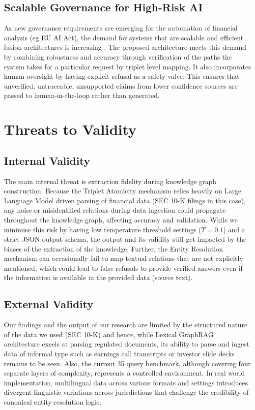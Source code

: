 \documentclass[conference]{IEEEtran}
\begin{document}
\subsection{Scalable Governance for High-Risk AI}
As new governance requirements are emerging for the automation of financial analysis (eg EU AI Act), the demand for systems that are scalable and efficient fusion architectures is increasing \cite{euaiact2024,occaiprinciples,fcaai2024}. The proposed architecture meets this demand by combining robustness and accuracy through verification of the paths the system takes for a particular request by triplet level mapping. It also incorporates human oversight by having explicit refusal as a safety valve. This ensures that unverified, untraceable, unsupported claims from lower confidence sources are passed to human-in-the-loop rather than generated.

\section{Threats to Validity}
\subsection{Internal Validity}
The main internal threat is extraction fidelity during knowledge graph construction. Because the Triplet Atomicity mechanism relies heavily on Large Language Model driven parsing of financial data (SEC 10-K filings in this case), any noise or misidentified relations during data ingestion could propagate throughout the knowledge graph, affecting accuracy and validation. While we minimise this risk by having low temperature threshold settings ($T=0.1$) and a strict JSON output schema, the output and its validity still get impacted by the biases of the extraction of the knowledge. Further, the Entity Resolution mechanism can occasionally fail to map textual relations that are not explicitly mentioned, which could lead to false refusals to provide verified answers even if the information is available in the provided data (source text).

\subsection{External Validity}
Our findings and the output of our research are limited by the structured nature of the data we used (SEC 10-K) and hence, while Lexical GraphRAG architecture excels at parsing regulated documents, its ability to parse and ingest data of informal type such as earnings call transcripts or investor slide decks remains to be seen. Also, the current 35 query benchmark, although covering four separate layers of complexity, represents a controlled environment. In real world implementation, multilingual data across various formats and settings introduces divergent linguistic variations across jurisdictions that challenge the credibility of canonical entity-resolution logic.
\end{document}
